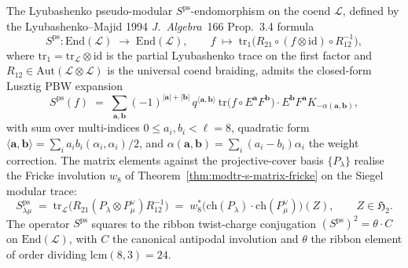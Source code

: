 \begin{theorem}
\label{thm:modtr-sps-coend-formula}
The Lyubashenko pseudo-modular $S^{\mathrm{ps}}$-endomorphism on the
coend $\mathcal L$, defined by the Lyubashenko--Majid 1994
\emph{J.\ Algebra}~166 Prop.~3.4 formula
\[
 \boxed{\;
 S^{\mathrm{ps}}\colon \mathrm{End}(\mathcal L)\;\longrightarrow\;
 \mathrm{End}(\mathcal L),
 \qquad
 f \;\longmapsto\; \mathrm{tr}_1\bigl(R_{21}\circ (f\otimes\mathrm{id})
 \circ R_{12}^{-1}\bigr),\;}
\]
where $\mathrm{tr}_1 = \mathrm{tr}_{\mathcal L}\otimes\mathrm{id}$ is
the partial Lyubashenko trace on the first factor and
$R_{12}\in\mathrm{Aut}(\mathcal L\otimes\mathcal L)$ is the universal
coend braiding, admits the closed-form Lusztig PBW expansion
\[
 S^{\mathrm{ps}}(f) \;=\;\!\!\sum_{\mathbf a, \mathbf b}\!\!
 (-1)^{|\mathbf a|+|\mathbf b|}\,q^{\langle \mathbf a, \mathbf b\rangle}\,
 \mathrm{tr}\bigl(f\circ E^{\mathbf a}F^{\mathbf b}\bigr)
 \cdot E^{\mathbf b}F^{\mathbf a}K_{-\alpha(\mathbf a,\mathbf b)},
\]
with sum over multi-indices $0\leq a_i, b_i < \ell = 8$, quadratic
form $\langle \mathbf a, \mathbf b\rangle = \sum_i a_i b_i(\alpha_i,\alpha_i)/2$,
and $\alpha(\mathbf a,\mathbf b) = \sum_i(a_i - b_i)\alpha_i$ the
weight correction. The matrix elements against the
projective-cover basis $\{P_\lambda\}$ realise the Fricke involution
$w_8$ of Theorem~\ref{thm:modtr-s-matrix-fricke} on the Siegel
modular trace:
\[
 S^{\mathrm{ps}}_{\lambda\mu}
 \;=\;
 \mathrm{tr}_{\mathcal L}\bigl(R_{21} (P_\lambda\otimes P_\mu^\vee)
 R_{12}^{-1}\bigr)
 \;=\;
 w_8^*\bigl(\mathrm{ch}(P_\lambda)\cdot\mathrm{ch}(P_\mu^\vee)\bigr)(Z),
 \qquad
 Z\in\mathfrak H_2.
\]
The operator $S^{\mathrm{ps}}$ squares to the ribbon twist-charge
conjugation $(S^{\mathrm{ps}})^2 = \theta\cdot C$ on
$\mathrm{End}(\mathcal L)$, with $C$ the canonical antipodal involution
and $\theta$ the ribbon element of order dividing
$\mathrm{lcm}(8, 3) = 24$.
\end{theorem}

